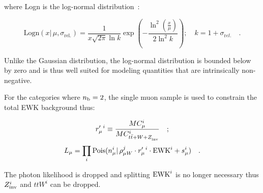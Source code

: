 where Logn is the log-normal
distribution~\cite{cousins-log-normal}:

\begin{equation}
\label{eq:log-normal}
\mathrm{Logn}(x |\,\mu,\sigma_{\mathrm{rel.}}) =
\frac{1}{x\sqrt{2\pi}\ln{k}}\exp{\left(-\frac{\ln^2{\left(\frac{x}{\mu}\right)}}{2\ln^2{k}}\right)};\quad
k=1+\sigma_{\mathrm rel.}\quad. 
\end{equation}

Unlike the Gaussian distribution, the log-normal distribution is bounded below by zero and is thus well suited for modeling 
quantities that are intrinsically non-negative. 

%
\newcommand{\rpi}{\ensuremath{r_{\mu}^{\prime\ i}}\xspace}

For the categories where $n_{\text{b}}=2$, the single muon sample is used to constrain the
total EWK background thus:

\begin{equation}
\rpi \equiv \frac{MC_{\mu}^i}{MC_{t\bar{t}+W+\zInv{}}^i}\quad ;
\end{equation}
\begin{equation}
\label{eq:muonLikelihoodTotalEwk}
L_{\mu}=\prod_i \mathrm{Pois}(n_{\mu}^i |\, \rho_{\mu W}^j \cdot
\rpi \cdot \ewk^{i} + s_{\mu}^i)\quad .
\end{equation}

The photon likelihood is dropped and splitting $\mathrm{EWK}^i$ is no longer
necessary thus $Z_{\rm inv}^{i}$ and $ttW^{i}$ can be dropped. 

